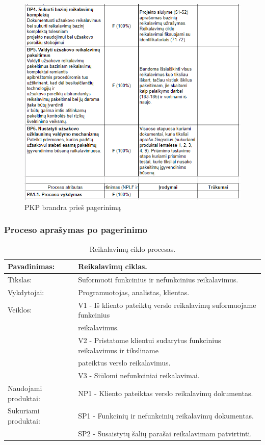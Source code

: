 \documentclass{VUMIFPSkursinis}
\begin{document}
	\begin{figure}[!htbp]
		\includegraphics[scale=1]{img/eng1two}
		\caption{PKP brandra prieš pagerinimą} %
		\label{img:pkpPries}
	\end{figure}
\subsubsection{Proceso aprašymas po pagerinimo}
\begin{center}
	\begin{table}[ht]
		\caption{Reikalavimų ciklo procesas.}
		\begin{tabular}{ | l | l | }
			\hline
			Pavadinimas:		& Reikalavimų ciklas.												\\ \hline
			Tikslas:		& Suformuoti funkcinius ir nefunkcinius reikalavimus.								\\ \hline
			Vykdytojai:		& Programuotojas, analistas, klientas.										\\ \hline
			Veiklos:		& V1 - Iš kliento pateiktų verslo reikalavimų suformuojame funkcinius \\ & reikalavimus. 			\\

						& V2 - Pristatome klientui sudarytus funkcinius reikalavimus ir tiksliname \\& pateiktus verslo reikalavimus.	\\
						& V3 - Siūlomi nefunkciniai reikalavimai.									\\ \hline
			Naudojami produktai:	& NP1 - Kliento pateiktas verslo reikalavimų dokumentas.							\\ \hline
			Sukuriami produktai:	& SP1 - Funkcinių ir nefunkcinių reikalavimų dokumentas.							\\ \hline
						& SP2 - Susaistytų šalių parašai reikalavimam patvirtinti.							\\ \hline
		\end{tabular}
	\end{table}
\end{center}
\end{document}
